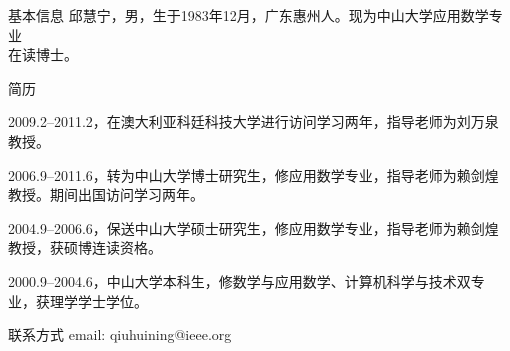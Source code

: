 
\begin{resume}

\begin{resumesection}{基本信息}
\mbox{邱慧宁，男，生于1983年12月，广东惠州人。现为中山大学应用数学专业}\\\mbox{在读博士。}
\end{resumesection}

\begin{resumelist}{简历}

2009.2--2011.2，在澳大利亚科廷科技大学进行访问学习两年，指导老师为刘万泉教授。

2006.9--2011.6，转为中山大学博士研究生，修应用数学专业，指导老师为赖剑煌教授。期间出国访问学习两年。

2004.9--2006.6，保送中山大学硕士研究生，修应用数学专业，指导老师为赖剑煌教授，获硕博连读资格。

2000.9--2004.6，中山大学本科生，修数学与应用数学、计算机科学与技术双专业，获理学学士学位。

\end{resumelist}

\begin{resumelist}{联系方式}
email: qiuhuining@ieee.org
\end{resumelist}



\end{resume}
